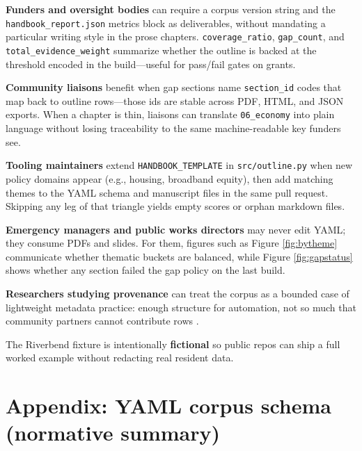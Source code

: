 \documentclass[
]{article}
\begin{document}
\textbf{Funders and oversight bodies} can require a corpus version
string and the \texttt{handbook\_report.json} metrics block as
deliverables, without mandating a particular writing style in the prose
chapters. \texttt{coverage\_ratio}, \texttt{gap\_count}, and
\texttt{total\_evidence\_weight} summarize whether the outline is backed
at the threshold encoded in the build---useful for pass/fail gates on
grants.

\textbf{Community liaisons} benefit when gap sections name
\texttt{section\_id} codes that map back to outline rows---those ids are
stable across PDF, HTML, and JSON exports. When a chapter is thin,
liaisons can translate \texttt{06\_economy} into plain language without
losing traceability to the same machine-readable key funders see.

\textbf{Tooling maintainers} extend \texttt{HANDBOOK\_TEMPLATE} in
\texttt{src/outline.py} when new policy domains appear (e.g., housing,
broadband equity), then add matching themes to the YAML schema and
manuscript files in the same pull request. Skipping any leg of that
triangle yields empty scores or orphan markdown files.

\textbf{Emergency managers and public works directors} may never edit
YAML; they consume PDFs and slides. For them, figures such as Figure
\ref{fig:bytheme} communicate whether thematic buckets are balanced,
while Figure \ref{fig:gapstatus} shows whether any section failed the
gap policy on the last build.

\textbf{Researchers studying provenance} can treat the corpus as a
bounded case of lightweight metadata practice: enough structure for
automation, not so much that community partners cannot contribute rows
\citep{gray2005}.

The Riverbend fixture is intentionally \textbf{fictional} so public
repos can ship a full worked example without redacting real resident
data.

\newpage

\section{Appendix: YAML corpus schema (normative
summary)}\label{appendix-yaml-corpus-schema-normative-summary}
\end{document}
